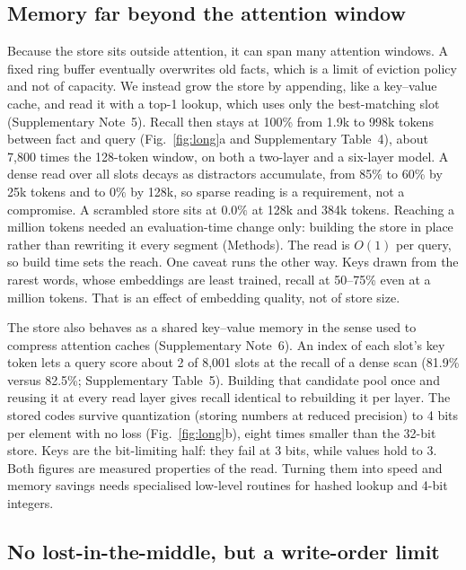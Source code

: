 \subsection*{Memory far beyond the attention window}

Because the store sits outside attention, it can span many attention windows. A fixed ring
buffer eventually overwrites old facts, which is a limit of eviction policy and not of
capacity. We
instead grow the store by appending, like a key--value cache, and read it with a top-1 lookup, which uses only the best-matching slot (Supplementary Note~5). Recall then stays at 100\% from 1.9k to 998k tokens between fact and query (Fig.~\ref{fig:long}a and Supplementary Table~4), about 7,800 times the 128-token window, on both a
two-layer and a six-layer model. A dense read over all slots decays as distractors
accumulate, from 85\% to 60\% by 25k tokens and to $0\%$ by 128k, so sparse reading is a
requirement, not a compromise. A scrambled store sits at $0.0\%$ at 128k and 384k tokens.
Reaching a million tokens needed an evaluation-time change only: building the store in place
rather than rewriting it every segment (Methods). The read is $O(1)$ per query, so build time
sets the reach. One caveat runs the other way. Keys drawn from
the rarest words, whose embeddings are least trained, recall at 50--75\% even at a million
tokens. That is an effect of embedding quality, not of store size.

The store also behaves as a shared key--value memory in the sense used to compress attention caches\cite{shazeer2019mqa,ainslie2023gqa,deepseekv2mla2024,deepseekv41flash2026} (Supplementary Note~6). An index of
each slot's key token lets a query score about 2 of 8,001 slots at the recall of a dense scan
(81.9\% versus 82.5\%; Supplementary Table~5). Building that candidate pool once and reusing it at every read layer
gives recall identical to rebuilding it per layer. The stored codes survive quantization (storing numbers at reduced precision) to 4 bits per element with no loss (Fig.~\ref{fig:long}b), eight times smaller than the
32-bit store. Keys are the
bit-limiting half: they fail at 3 bits, while values hold to 3. Both figures are measured
properties of the read. Turning them into speed and memory savings needs specialised low-level routines for hashed lookup and 4-bit integers.

\subsection*{No lost-in-the-middle, but a write-order limit}

